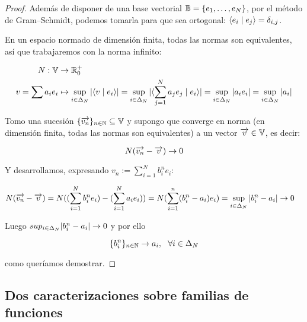 \begin{proof}
    Además de disponer de una base vectorial $\mathbb{B} = \{ e_1, \ldots, e_N \}$, por el método de Gram–Schmidt, podemos tomarla para que sea ortogonal: $\langle e_i \; | \; e_j \rangle = \delta_{i, j}$.

    En un espacio normado de dimensión finita, todas las normas son equivalentes, así que trabajaremos con la norma infinito:

    \begin{equation}
    \begin{split}
        N: \mathbb{V} &\to \mathbb{R}_0^+ \\
         v = \sum a_i e_i &\mapsto \sup_{i \in \Delta_{N}} |\langle v \; | \; e_i \rangle| = \sup_{i \in \Delta_{N}} |\langle \sum_{j = 1}^N a_j e_j \; | \; e_i \rangle| = \sup_{i \in \Delta_{N}} |a_i e_i| = \sup_{i \in \Delta_{N}} |a_i|
    \end{split}
    \end{equation}


    Tomo una sucesión $\{ \overrightarrow{v_n} \}_{n \in \mathbb{N}} \subseteq \mathbb{V}$ y supongo que converge en norma (en dimensión finita, todas las normas son equivalentes) a un vector $\overrightarrow{v} \in \mathbb{V}$, es decir:

    \begin{equation}
        N(\overrightarrow{v_n} - \overrightarrow{v}) \to 0
    \end{equation}

    Y desarrollamos, expresando $v_n := \sum_{i = 1}^N b_i^n e_i$:

    \begin{equation}
    \begin{split}
        N(\overrightarrow{v_n} - \overrightarrow{v}) &= N((\sum_{i = 1}^N b_i^n e_i) - (\sum_{i = 1}^N a_i e_i)) = N(\sum_{i = 1}^n (b_i^n - a_i) e_i) = \sup_{i \in \Delta_{N}} |b_i^n - a_i | \to 0
    \end{split}
    \end{equation}

    Luego $sup_{i \in \Delta_{N}} |b_i^n - a_i| \to 0$ y por ello

    \begin{equation}
        \{ b_i^n \}_{n \in \mathbb{N}} \to a_i, \ \  \forall i \in \Delta_{N}
    \end{equation}

    como queríamos demostrar.
\end{proof}

\subsection{Dos caracterizaciones sobre familias de funciones} \label{subs:caracterizaciones_familias_funciones}

